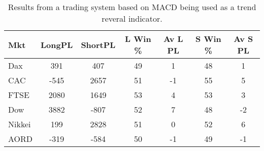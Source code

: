 \begin{table}[ht]
\centering
\caption[Results from a system based on MACD as trend reversal indicator]{Results from a trading system based on MACD being used as a trend reveral indicator.} 
\label{tab:mac_ob_results}
\begin{tabular}{lcccccc}
  \toprule Mkt & LongPL & ShortPL & L Win \% & Av L PL & S Win \% & Av S PL \\ 
  \midrule Dax & 391 & 407 & 49 & 1 & 48 & 1 \\ 
  CAC & -545 & 2657 & 51 & -1 & 55 & 5 \\ 
  FTSE & 2080 & 1649 & 53 & 4 & 53 & 3 \\ 
  Dow & 3882 & -807 & 52 & 7 & 48 & -2 \\ 
  Nikkei & 199 & 2828 & 51 & 0 & 52 & 6 \\ 
  AORD & -319 & -584 & 50 & -1 & 49 & -1 \\ 
   \bottomrule \end{tabular}
\end{table}
